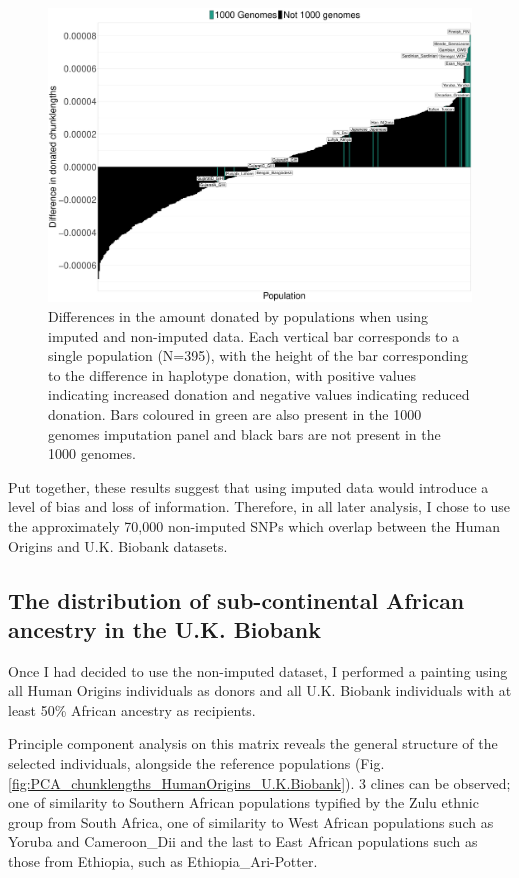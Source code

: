 \begin{figure}
	    \centering
	    \includegraphics[width=1.0\textwidth]{../images/chapter3/imputed_excess_copying_pops.pdf}
	    \caption{Differences in the amount donated by populations when using imputed and non-imputed data. Each vertical bar corresponds to a single population (N=395), with the height of the bar corresponding to the difference in haplotype donation, with positive values indicating increased donation and negative values indicating reduced donation. Bars coloured in green are also present in the 1000 genomes imputation panel and black bars are not present in the 1000 genomes.}
	    \label{fig:imputed_excess_copying_pops}
\end{figure}

Put together, these results suggest that using imputed data would introduce a level of bias and loss of information. Therefore, in all later analysis, I chose to use the approximately 70,000 non-imputed SNPs which overlap between the Human Origins and U.K. Biobank datasets. 

\subsection{The distribution of sub-continental African ancestry in the U.K. Biobank}

Once I had decided to use the non-imputed dataset, I performed a painting using all Human Origins individuals as donors and all U.K. Biobank individuals with at least 50\% African ancestry as recipients. 

Principle component analysis on this matrix reveals the general structure of the selected individuals, alongside the reference populations (Fig. \ref{fig:PCA_chunklengths_HumanOrigins_U.K.Biobank}). 3 clines can be observed; one of similarity to Southern African populations typified by the Zulu ethnic group from South Africa, one of similarity to West African populations such as Yoruba and Cameroon\_Dii and the last to East African populations such as those from Ethiopia, such as Ethiopia\_Ari-Potter. 

